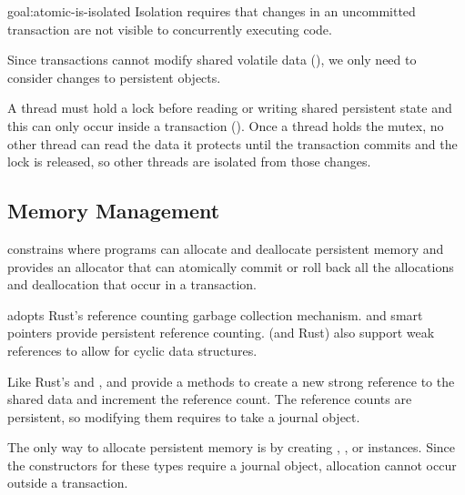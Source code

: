 \begin{goaltrue}{goal:atomic-is-isolated}
  Isolation requires that changes in an uncommitted transaction are not visible
  to concurrently executing code.

  Since transactions cannot modify shared volatile data
  (), we only need to consider changes to
  persistent objects.

  A thread must hold a lock before reading or writing shared persistent state
  and this can only occur inside a transaction
  ().  Once a thread holds the mutex, no other
  thread can read the data it protects until the transaction commits and the lock is released, so other threads are isolated from
  those changes.
\end{goaltrue}

\subsection{Memory Management}

\This{} constrains where programs can allocate and deallocate persistent memory
and provides an allocator that can atomically commit or roll back all the
allocations and deallocation that occur in a transaction.

\This{} adopts Rust's reference counting garbage collection mechanism.
 and  smart pointers provide
 persistent reference counting.  \This{} (and Rust)
also support weak references to allow for cyclic data structures.

Like Rust's  and ,   and  provide
a  methods to create a new strong reference to the shared data and
increment the reference count.  The reference counts are persistent, so
modifying them requires  to take a journal object.

 The only way to allocate persistent memory is by
creating , , or  instances.  Since the
constructors for these types require a journal object, allocation cannot
occur outside a transaction.


